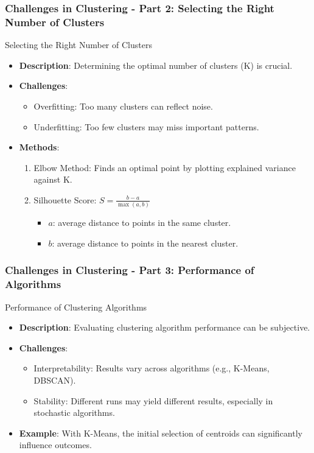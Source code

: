 \documentclass[aspectratio=169]{beamer}
\begin{document}
\begin{frame}[fragile]
    \frametitle{Challenges in Clustering - Part 2: Selecting the Right Number of Clusters}
    \begin{block}{Selecting the Right Number of Clusters}
        \begin{itemize}
            \item \textbf{Description}: Determining the optimal number of clusters (K) is crucial.
            \item \textbf{Challenges}:
                \begin{itemize}
                    \item Overfitting: Too many clusters can reflect noise.
                    \item Underfitting: Too few clusters may miss important patterns.
                \end{itemize}
            \item \textbf{Methods}:
                \begin{enumerate}
                    \item Elbow Method: Finds an optimal point by plotting explained variance against K.
                    \item Silhouette Score: $S = \frac{b - a}{\max(a, b)}$ 
                    \begin{itemize}
                        \item $a$: average distance to points in the same cluster.
                        \item $b$: average distance to points in the nearest cluster.
                    \end{itemize}
                \end{enumerate}
        \end{itemize}
    \end{block}
\end{frame}

\begin{frame}[fragile]
    \frametitle{Challenges in Clustering - Part 3: Performance of Algorithms}
    \begin{block}{Performance of Clustering Algorithms}
        \begin{itemize}
            \item \textbf{Description}: Evaluating clustering algorithm performance can be subjective.
            \item \textbf{Challenges}:
                \begin{itemize}
                    \item Interpretability: Results vary across algorithms (e.g., K-Means, DBSCAN).
                    \item Stability: Different runs may yield different results, especially in stochastic algorithms.
                \end{itemize}
            \item \textbf{Example}: With K-Means, the initial selection of centroids can significantly influence outcomes.
        \end{itemize}
    \end{block}
\end{frame}
\end{document}
